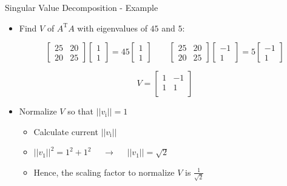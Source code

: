 \begin{frame}[t]{Singular Value Decomposition - Example}
    \begin{itemize}
    \item Find $V$ of $A^{\text{T}}A$ with eigenvalues of $45$ and $5$: 

    \begin{equation*}
        \begin{bmatrix}
            25 & 20 \\
            20 & 25
        \end{bmatrix}
        \begin{bmatrix}
            1 \\ 1 
        \end{bmatrix}
        = 45
        \begin{bmatrix}
            1 \\ 1 
        \end{bmatrix}
        \quad \quad
        \begin{bmatrix}
            25 & 20 \\
            20 & 25
        \end{bmatrix}
        \begin{bmatrix}
            -1 \\ 1 
        \end{bmatrix}
        = 5
        \begin{bmatrix}
            -1 \\ 1 
        \end{bmatrix}
    \end{equation*}

    \begin{equation*}
        V=
        \begin{bmatrix}
            1 & -1 \\
            1 & 1 \\
        \end{bmatrix}
    \end{equation*}

    \item Normalize $V$ so that $||v_{\text{i}}||=1$
        \begin{itemize}
            \item Calculate current $||v_{\text{i}}||$
            \item $||v_{\text{1}}||^2=1^2+1^2$ $\quad \rightarrow \quad$
                $||v_{\text{1}}||=\sqrt 2$
            \item Hence, the scaling factor to normalize $V$ is $\frac{1}{\sqrt
                2}$
        \end{itemize}            


\end{itemize}
\end{frame}
